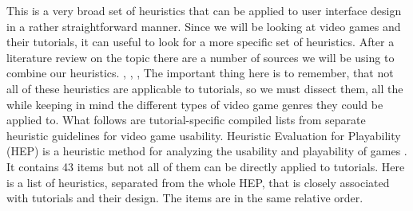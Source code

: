 This is a very broad set of heuristics that can be applied to user interface design in a rather straightforward manner. Since we will be looking at video games and their tutorials, it can useful to look for a more specific set of heuristics. After a literature review on the topic there are a number of sources we will be using to combine our heuristics. \cite{Desurvire2004}, \cite{Desurvire2009}, \cite{Federoff2002}, \cite{Pinelle2008}
The important thing here is to remember, that not all of these heuristics are applicable to tutorials, so we must dissect them, all the while keeping in mind the different types of video game genres they could be applied to. What follows are tutorial-specific compiled lists from separate heuristic guidelines for video game usability. Heuristic Evaluation for Playability (HEP) is a heuristic method for analyzing the usability and playability of games \cite{Desurvire2004}. It contains 43 items but not all of them can be directly applied to tutorials. Here is a list of heuristics, separated from the whole HEP, that is closely associated with tutorials and their design. The items are in the same relative order.

